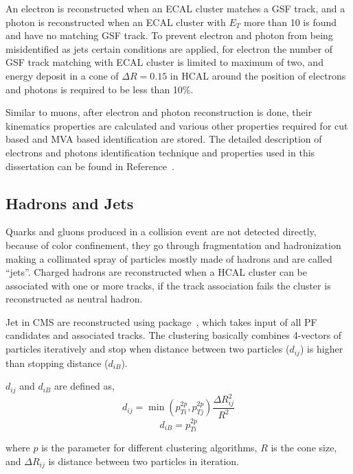 An electron is reconstructed when an \gls{ECAL} cluster matches a \gls{GSF} track,
and a photon is reconstructed when an \gls{ECAL} cluster with \( E_T \)
more than 10\GeV{} is found and have no matching \gls{GSF} track. To prevent
electron and photon from being misidentified as jets certain conditions are applied,
for electron the number of \gls{GSF} track matching with \gls{ECAL} cluster is limited to
maximum of two, and energy deposit in a cone of \( \Delta R = 0.15 \) in \gls{HCAL}
around the position of electrons and photons is required to be less than 10\%.

Similar to muons, after electron and photon reconstruction is done, their kinematics properties
are calculated and various other properties required for cut based
and \gls{MVA} based identification are stored. The detailed description of electrons
and photons identification technique and properties used in this dissertation
can be found in Reference~\cite{cms-egamma-id}.

\subsection{
  Hadrons and Jets
}

Quarks and gluons produced in a collision event are not detected directly,
because of color confinement, they go through fragmentation and
hadronization making a collimated spray of particles mostly made of hadrons
and are called ``jets''. Charged hadrons are reconstructed when a \gls{HCAL} cluster can be associated with
one or more tracks, if the track association fails the cluster is reconstructed as
neutral hadron.

Jet in \gls{CMS} are reconstructed using \FASTJET{} package~\cite{fastjet-manual},
which takes input of all \gls{PF} candidates and associated tracks. The clustering
basically combines 4-vectors of particles iteratively and stop when distance between
two particles (\( d_{ij} \)) is higher than stopping distance (\( d_{iB} \)).

\( d_{ij} \) and \( d_{iB} \) are defined as,
%
\begin{equation}
  d_{ij} = \min (p_{Ti}^{2p}, p_{Tj}^{2p}) \frac{\Delta R_{ij}^{2}}{R^{2}}
\end{equation}
%
\begin{equation}
  d_{iB} = p_{Ti}^{2p}
\end{equation}

where \( p \) is the parameter for different clustering algorithms, \( R \) is the
cone size, and
\( \Delta R_{ij} \) is distance between two particles in iteration.

